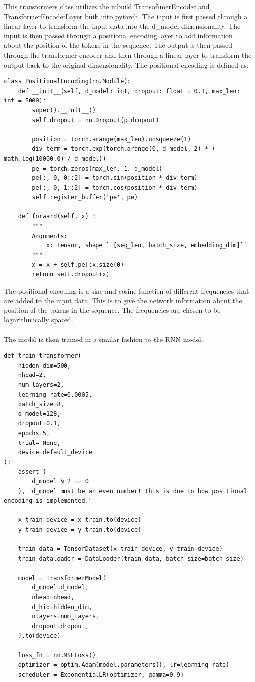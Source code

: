 \documentclass[11pt]{article}
\begin{document}
This transformers class utilizes the inbuild TransofrmerEncoder and TransformerEncoderLayer built into pytorch. The input is first passed through a linear layer to transform the input data into the d\_model dimensionality. The input is then passed through a positional encoding layer to add information about the position of the tokens in the sequence. The output is then passed through the transformer encoder and then through a linear layer to transform the output back to the original dimensionality. The positional encoding is defined as:

\begin{lstlisting}
class PositionalEncoding(nn.Module):
    def __init__(self, d_model: int, dropout: float = 0.1, max_len: int = 5000):
        super().__init__()
        self.dropout = nn.Dropout(p=dropout)

        position = torch.arange(max_len).unsqueeze(1)
        div_term = torch.exp(torch.arange(0, d_model, 2) * (-math.log(10000.0) / d_model))
        pe = torch.zeros(max_len, 1, d_model)
        pe[:, 0, 0::2] = torch.sin(position * div_term)
        pe[:, 0, 1::2] = torch.cos(position * div_term)
        self.register_buffer('pe', pe)

    def forward(self, x) :
        """
        Arguments:
            x: Tensor, shape ``[seq_len, batch_size, embedding_dim]``
        """
        x = x + self.pe[:x.size(0)]
        return self.dropout(x)
\end{lstlisting}

The positional encoding is a sine and cosine function of different frequencies that are added to the input data. This is to give the network information about the position of the tokens in the sequence. The frequencies are chosen to be logarithmically spaced. \\ \\ The model is then trained in a similar fashion to the RNN model.

\begin{lstlisting}
def train_transformer(
    hidden_dim=500,
    nhead=2,
    num_layers=2,
    learning_rate=0.0005,
    batch_size=8,
    d_model=128,
    dropout=0.1,
    epochs=5,
    trial= None,
    device=default_device
):
    assert (
        d_model % 2 == 0
    ), "d_model must be an even number! This is due to how positional encoding is implemented."

    x_train_device = x_train.to(device)
    y_train_device = y_train.to(device)

    train_data = TensorDataset(x_train_device, y_train_device)
    train_dataloader = DataLoader(train_data, batch_size=batch_size)

    model = TransformerModel(
        d_model=d_model,
        nhead=nhead,
        d_hid=hidden_dim,
        nlayers=num_layers,
        dropout=dropout,
    ).to(device)

    loss_fn = nn.MSELoss()
    optimizer = optim.Adam(model.parameters(), lr=learning_rate)
    scheduler = ExponentialLR(optimizer, gamma=0.9)
\end{lstlisting}
\end{document}
